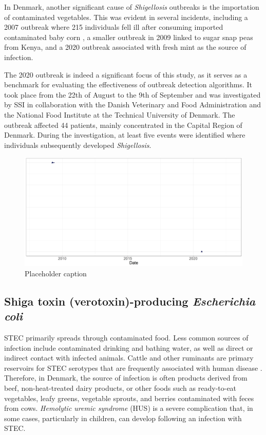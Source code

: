 \documentclass[a4paper,twoside,11pt]{report} %
\theoremstyle{definition}
\theoremstyle{definition}
\theoremstyle{definition}
\theoremstyle{definition}
\theoremstyle{remark}
\begin{document}
In Denmark, another significant cause of \textit{Shigellosis} outbreaks is the importation of contaminated vegetables. This was evident in several incidents, including a 2007 outbreak where 215 individuals fell ill after consuming imported contaminated baby corn \autocite{Lewis_2009,Muller_2009}, a smaller outbreak in 2009 linked to sugar snap peas from Kenya, and a 2020 outbreak associated with fresh mint as the source of infection.

The 2020 outbreak is indeed a significant focus of this study, as it serves as a benchmark for evaluating the effectiveness of outbreak detection algorithms. It took place from the 22th of August to the 9th of September and was investigated by SSI in collaboration with the Danish Veterinary and Food Administration and the National Food Institute at the Technical University of Denmark. The outbreak affected 44 patients, mainly concentrated in the Capital Region of Denmark. During the investigation, at least five events were identified where individuals subsequently developed \textit{Shigellosis}.



\begin{figure}[H]
\includegraphics[width=1\linewidth]{../figures/SHIG_SSI_outbreaks} \caption{Placeholder caption}\label{fig:SHIGSSIoutbreaks}
\end{figure}

\subsection{Shiga toxin (verotoxin)-producing \textit{Escherichia coli}}

STEC primarily spreads through contaminated food. Less common sources of infection include contaminated drinking and bathing water, as well as direct or indirect contact with infected animals. Cattle and other ruminants are primary reservoirs for STEC serotypes that are frequently associated with human disease \autocite{Menge_2020}. Therefore, in Denmark, the source of infection is often products derived from beef, non-heat-treated dairy products, or other foods such as ready-to-eat vegetables, leafy greens, vegetable sprouts, and berries contaminated with feces from cows. \textit{Hemolytic uremic syndrome} (HUS) is a severe complication that, in some cases, particularly in children, can develop following an infection with STEC.
\end{document}
